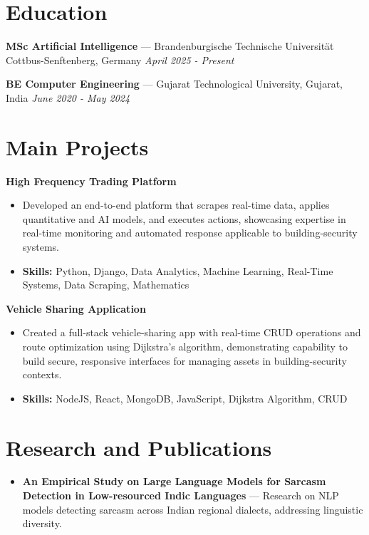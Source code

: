 \documentclass[a4paper,10pt]{article}
\begin{document}
\section*{Education}
\textbf{MSc Artificial Intelligence} — Brandenburgische Technische Universität Cottbus-Senftenberg, Germany \hfill \textit{April 2025 - Present}\par
\vspace{1.5pt}
\textbf{BE Computer Engineering} — Gujarat Technological University, Gujarat, India \hfill \textit{June 2020 - May 2024}\par

\section*{Main Projects}
\textbf{High Frequency Trading Platform}\par
\vspace{1pt}
\begin{itemize}
  \item Developed an end-to-end platform that scrapes real-time data, applies quantitative and AI models, and executes actions, showcasing expertise in real-time monitoring and automated response applicable to building-security systems.
  \item \textbf{Skills:} Python, Django, Data Analytics, Machine Learning, Real-Time Systems, Data Scraping, Mathematics
\end{itemize}
\vspace{3pt}
\textbf{Vehicle Sharing Application}\par
\vspace{1pt}
\begin{itemize}
  \item Created a full-stack vehicle-sharing app with real-time CRUD operations and route optimization using Dijkstra's algorithm, demonstrating capability to build secure, responsive interfaces for managing assets in building-security contexts.
  \item \textbf{Skills:} NodeJS, React, MongoDB, JavaScript, Dijkstra Algorithm, CRUD
\end{itemize}

\section*{Research and Publications}
\begin{itemize}
\item \textbf{An Empirical Study on Large Language Models for Sarcasm Detection in Low-resourced Indic Languages} — Research on NLP models detecting sarcasm across Indian regional dialects, addressing linguistic diversity.
\end{itemize}
\end{document}
